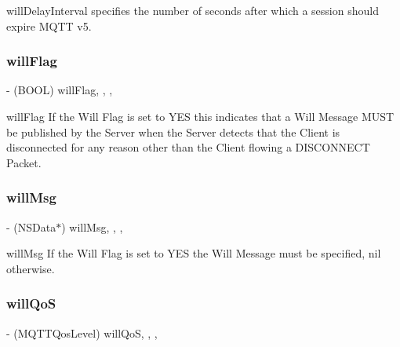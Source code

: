 will\+Delay\+Interval specifies the number of seconds after which a session should expire M\+Q\+TT v5. \mbox{\label{interface_m_q_t_t_session_aa3227d1cd407e13f1dd694cb352951d7}} 
\subsubsection{\texorpdfstring{will\+Flag}{willFlag}}
{\footnotesize\ttfamily -\/ (B\+O\+OL) will\+Flag\hspace{0.3cm}{\ttfamily [read]}, {\ttfamily [write]}, {\ttfamily [nonatomic]}, {\ttfamily [assign]}}

will\+Flag If the Will Flag is set to Y\+ES this indicates that a Will Message M\+U\+ST be published by the Server when the Server detects that the Client is disconnected for any reason other than the Client flowing a D\+I\+S\+C\+O\+N\+N\+E\+CT Packet. \mbox{\label{interface_m_q_t_t_session_a10be0166d86c90591c40b79923eba9ba}} 
\subsubsection{\texorpdfstring{will\+Msg}{willMsg}}
{\footnotesize\ttfamily -\/ (N\+S\+Data$\ast$) will\+Msg\hspace{0.3cm}{\ttfamily [read]}, {\ttfamily [write]}, {\ttfamily [nonatomic]}, {\ttfamily [strong]}}

will\+Msg If the Will Flag is set to Y\+ES the Will Message must be specified, nil otherwise. \mbox{\label{interface_m_q_t_t_session_af9cee4ec8306915190b101441f673a71}} 
\subsubsection{\texorpdfstring{will\+QoS}{willQoS}}
{\footnotesize\ttfamily -\/ (M\+Q\+T\+T\+Qos\+Level) will\+QoS\hspace{0.3cm}{\ttfamily [read]}, {\ttfamily [write]}, {\ttfamily [nonatomic]}, {\ttfamily [assign]}}

